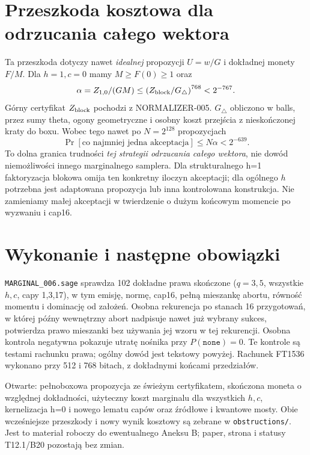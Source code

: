\documentclass[11pt,a4paper]{article}
\newcommand{\code}[1]{\nolinkurl{#1}}
\newcommand{\none}{\mathtt{none}}
\begin{document}
\section{Przeszkoda kosztowa dla odrzucania całego wektora}
Ta przeszkoda dotyczy nawet \emph{idealnej} propozycji $U=w/G$ i dokładnej
monety $F/M$. Dla $h=1,c=0$ mamy $M\ge F(0)\ge1$ oraz
\[
 \alpha=Z_{1,0}/(GM)
 \le\left(Z_{\rm block}/G_\triangle\right)^{768}<2^{-767}.
\]
Górny certyfikat $Z_{\rm block}$ pochodzi z NORMALIZER-005.
$G_\triangle$ obliczono w balls, przez sumy theta, ogony geometryczne
i osobny koszt przejścia z nieskończonej kraty do boxu.
Wobec tego nawet po $N=2^{128}$ propozycjach
\[
 \Pr[\text{co najmniej jedna akceptacja}]\le N\alpha<2^{-639}.
\]
To dolna granica trudności \emph{tej strategii odrzucania całego wektora},
nie dowód niemożliwości innego marginalnego samplera.
Dla strukturalnego h=1 faktoryzacja blokowa omija ten konkretny iloczyn
akceptacji; dla ogólnego $h$ potrzebna jest adaptowana propozycja lub inna
kontrolowana konstrukcja. Nie zamieniamy małej akceptacji w twierdzenie
o dużym końcowym momencie po wyzwaniu i cap16.

\section{Wykonanie i następne obowiązki}
\code{MARGINAL_006.sage} sprawdza 102 dokładne prawa skończone
($q=3,5$, wszystkie $h,c$, capy 1,3,17), w tym emisję, normę, cap16,
pełną mieszankę abortu, równość momentu i dominację od założeń.
Osobna rekurencja po stanach 16 przygotowań, w której późny wewnętrzny
abort nadpisuje nawet już wybrany sukces, potwierdza prawo mieszanki
bez używania jej wzoru w tej rekurencji.
Osobna kontrola negatywna pokazuje utratę nośnika przy $P(\none)=0$.
Te kontrole są testami rachunku prawa; ogólny dowód jest tekstowy powyżej.
Rachunek FT1536 wykonano przy 512 i 768 bitach, z dokładnymi końcami przedziałów.

Otwarte: pełnoboxowa propozycja ze świeżym certyfikatem, skończona moneta
o względnej dokładności, użyteczny koszt marginalu dla wszystkich $h,c$,
kernelizacja h=0 i nowego lematu capów oraz źródłowe i kwantowe mosty.
Obie wcześniejsze przeszkody i nowy wynik kosztowy są zebrane w
\code{obstructions/}. Jest to materiał roboczy do ewentualnego Aneksu B;
paper, strona i statusy T12.1/B20 pozostają bez zmian.
\end{document}

